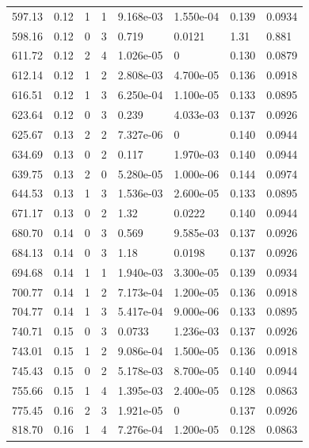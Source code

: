 \documentclass[preview]{standalone}
\begin{document}
{{{\begin{tabular}{L{1.2cm}C{1.2cm} C{0.3cm}C{0.5cm} C{1.4cm}C{1.4cm} C{1.4cm}C{1.4cm}}
  597.13  &  0.12  & 1     &  1 &  9.168e-03  & 1.550e-04  & 0.139 &  0.0934   \\ 
  598.16  &  0.12  & 0     &  3 &  0.719  & 0.0121  & 1.31 &  0.881   \\ 
  611.72  &  0.12  & 2     &  4 &  1.026e-05  & 0  & 0.130 &  0.0879   \\ 
  612.14  &  0.12  & 1     &  2 &  2.808e-03  & 4.700e-05  & 0.136 &  0.0918   \\ 
  616.51  &  0.12  & 1     &  3 &  6.250e-04  & 1.100e-05  & 0.133 &  0.0895   \\ 
  623.64  &  0.12  & 0     &  3 &  0.239  & 4.033e-03  & 0.137 &  0.0926   \\ 
  625.67  &  0.13  & 2     &  2 &  7.327e-06  & 0  & 0.140 &  0.0944   \\ 
  634.69  &  0.13  & 0     &  2 &  0.117  & 1.970e-03  & 0.140 &  0.0944   \\ 
  639.75  &  0.13  & 2     &  0 &  5.280e-05  & 1.000e-06  & 0.144 &  0.0974   \\ 
  644.53  &  0.13  & 1     &  3 &  1.536e-03  & 2.600e-05  & 0.133 &  0.0895   \\ 
  671.17  &  0.13  & 0     &  2 &  1.32  & 0.0222  & 0.140 &  0.0944   \\ 
  680.70  &  0.14  & 0     &  3 &  0.569  & 9.585e-03  & 0.137 &  0.0926   \\ 
  684.13  &  0.14  & 0     &  3 &  1.18  & 0.0198  & 0.137 &  0.0926   \\ 
  694.68  &  0.14  & 1     &  1 &  1.940e-03  & 3.300e-05  & 0.139 &  0.0934   \\ 
  700.77  &  0.14  & 1     &  2 &  7.173e-04  & 1.200e-05  & 0.136 &  0.0918   \\ 
  704.77  &  0.14  & 1     &  3 &  5.417e-04  & 9.000e-06  & 0.133 &  0.0895   \\ 
  740.71  &  0.15  & 0     &  3 &  0.0733  & 1.236e-03  & 0.137 &  0.0926   \\ 
  743.01  &  0.15  & 1     &  2 &  9.086e-04  & 1.500e-05  & 0.136 &  0.0918   \\ 
  745.43  &  0.15  & 0     &  2 &  5.178e-03  & 8.700e-05  & 0.140 &  0.0944   \\ 
  755.66  &  0.15  & 1     &  4 &  1.395e-03  & 2.400e-05  & 0.128 &  0.0863   \\ 
  775.45  &  0.16  & 2     &  3 &  1.921e-05  & 0  & 0.137 &  0.0926   \\ 
  818.70  &  0.16  & 1     &  4 &  7.276e-04  & 1.200e-05  & 0.128 &  0.0863   \\ 

\end{tabular}}}}
\end{document}
